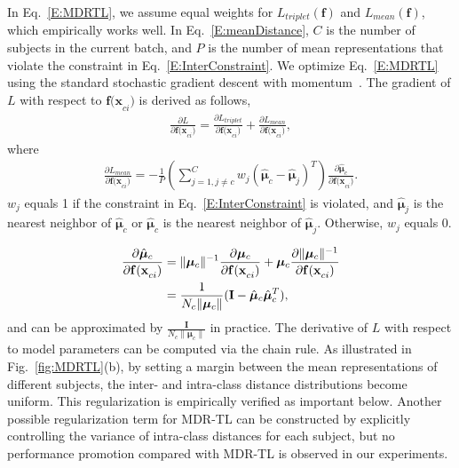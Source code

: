 \documentclass[10pt,journal,cspaper,compsoc]{IEEEtran}
\begin{document}
In Eq.~\ref{E:MDRTL}, we assume equal weights for $L_{triplet}(\mathbf{f})$ and $L_{mean}(\mathbf{f})$, which empirically works well.
In Eq.~\ref{E:meanDistance}, $C$ is the number of subjects in the current batch,
and $P$ is the number of mean representations that violate the constraint in Eq.~\ref{E:InterConstraint}.
We optimize Eq.~\ref{E:MDRTL} using the standard stochastic gradient descent with momentum~\cite{jia2014caffe}.
The gradient of $L$ with respect to $\mathbf{f(x}_{ci})$ is derived as follows,
\begin{align}
\frac{\partial L}{\partial \mathbf{f(x}_{ci})} = \frac{\partial L_{triplet}}{\partial \mathbf{f(x}_{ci})} + \frac{\partial L_{mean}}{\partial \mathbf{f(x}_{ci})},
\end{align}
where
\begin{align}
\frac{\partial L_{mean}}{\partial \mathbf{f(x}_{ci})} = -\frac{1}{P} (\sum_{j=1,j\neq c}^{C}w_{j}(\hat{\bm{\mu}}_{c}-\hat{\bm{\mu}}_{j})^{T}) \frac{\partial \hat{\bm{\mu}}_{c}}{\partial \mathbf{f(x}_{ci})}.
\end{align}
$w_{j}$ equals 1 if the constraint in Eq.~\ref{E:InterConstraint} is violated,
and $\hat{\bm{\mu}}_{j}$ is the nearest neighbor of $\hat{\bm{\mu}}_{c}$ or $\hat{\bm{\mu}}_{c}$ is the nearest neighbor of $\hat{\bm{\mu}}_{j}$.
Otherwise, $w_{j}$ equals 0.

\begin{align}
\notag \frac{\partial \hat{\bm{\mu}}_{c}}{\partial \mathbf{f(x}_{ci})} &= \|\bm{\mu}_{c}\|^{-1}\frac{\partial \bm{\mu}_{c}}{\partial \mathbf{f(x}_{ci})} + \bm{\mu}_{c}\frac{\partial \|\bm{\mu}_{c}\|^{-1}}{\partial \mathbf{f(x}_{ci})}\\
\notag &=\frac{1}{N_{c}\|\bm{\mu}_{c}\|} (\mathbf{I}-\hat{\bm{\mu}}_{c}\hat{\bm{\mu}}_{c}^{T}), \\
\end{align}
and can be approximated by $\frac{\mathbf{I}}{N_{c}\|\bm{\mu}_{c}\|}$ in practice.
The derivative of $L$ with respect to model parameters can be computed via the chain rule.
As illustrated in Fig.~\ref{fig:MDRTL}(b), by setting a margin between the mean representations of different subjects,
the inter- and intra-class distance distributions become uniform.
This regularization is empirically verified as important below.
Another possible regularization term for MDR-TL can be constructed by explicitly controlling the variance of intra-class distances for each subject,
but no performance promotion compared with MDR-TL is observed in our experiments.
\end{document}
